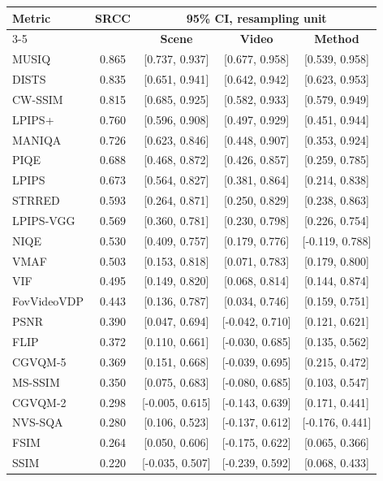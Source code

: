 \begin{tabular}{l|c|ccc}
\hline
\multirow{2}{*}{\textbf{Metric}} & \multirow{2}{*}{\textbf{SRCC}} & \multicolumn{3}{c}{\textbf{95\% CI, resampling unit}} \\
\cline{3-5}
 & & \textbf{Scene} & \textbf{Video} & \textbf{Method} \\
\hline
MUSIQ & 0.865 & [0.737, 0.937] & [0.677, 0.958] & [0.539, 0.958] \\
DISTS & 0.835 & [0.651, 0.941] & [0.642, 0.942] & [0.623, 0.953] \\
CW-SSIM & 0.815 & [0.685, 0.925] & [0.582, 0.933] & [0.579, 0.949] \\
LPIPS+ & 0.760 & [0.596, 0.908] & [0.497, 0.929] & [0.451, 0.944] \\
MANIQA & 0.726 & [0.623, 0.846] & [0.448, 0.907] & [0.353, 0.924] \\
PIQE & 0.688 & [0.468, 0.872] & [0.426, 0.857] & [0.259, 0.785] \\
LPIPS & 0.673 & [0.564, 0.827] & [0.381, 0.864] & [0.214, 0.838] \\
STRRED & 0.593 & [0.264, 0.871] & [0.250, 0.829] & [0.238, 0.863] \\
LPIPS-VGG & 0.569 & [0.360, 0.781] & [0.230, 0.798] & [0.226, 0.754] \\
NIQE & 0.530 & [0.409, 0.757] & [0.179, 0.776] & [-0.119, 0.788] \\
VMAF & 0.503 & [0.153, 0.818] & [0.071, 0.783] & [0.179, 0.800] \\
VIF & 0.495 & [0.149, 0.820] & [0.068, 0.814] & [0.144, 0.874] \\
FovVideoVDP & 0.443 & [0.136, 0.787] & [0.034, 0.746] & [0.159, 0.751] \\
PSNR & 0.390 & [0.047, 0.694] & [-0.042, 0.710] & [0.121, 0.621] \\
FLIP & 0.372 & [0.110, 0.661] & [-0.030, 0.685] & [0.135, 0.562] \\
CGVQM-5 & 0.369 & [0.151, 0.668] & [-0.039, 0.695] & [0.215, 0.472] \\
MS-SSIM & 0.350 & [0.075, 0.683] & [-0.080, 0.685] & [0.103, 0.547] \\
CGVQM-2 & 0.298 & [-0.005, 0.615] & [-0.143, 0.639] & [0.171, 0.441] \\
NVS-SQA & 0.280 & [0.106, 0.523] & [-0.137, 0.612] & [-0.176, 0.441] \\
FSIM & 0.264 & [0.050, 0.606] & [-0.175, 0.622] & [0.065, 0.366] \\
SSIM & 0.220 & [-0.035, 0.507] & [-0.239, 0.592] & [0.068, 0.433] \\
\hline
\end{tabular}
